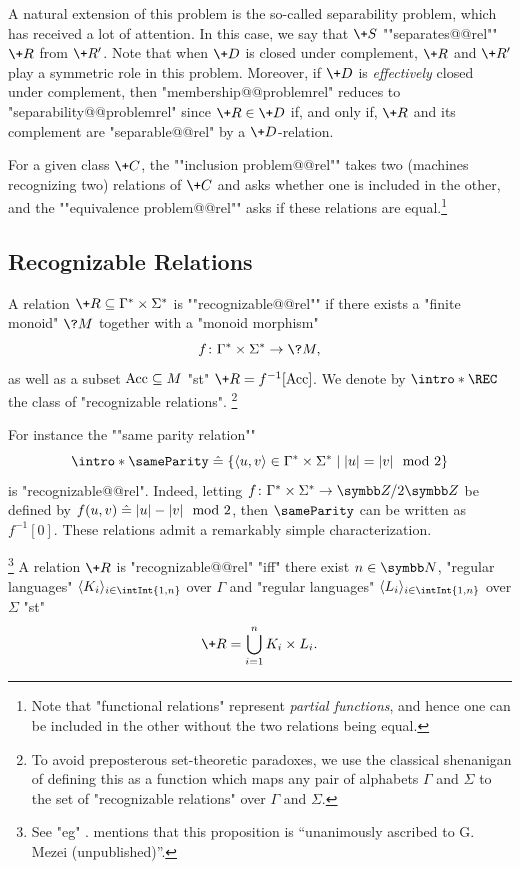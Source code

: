 A natural extension of this problem is the so-called separability problem,
which has received a lot of attention.
In this case, we say that $\+S$ ""separates@@rel"" $\+R$ from $\+R'$.
Note that when $\+D$ is closed under complement, $\+R$ and $\+R'$ play a symmetric role in this problem. Moreover, if $\+D$ is \emph{effectively} closed under complement,
then "membership@@problemrel" reduces to "separability@@problemrel" 
since $\+R \in \+D$ if, and only if, $\+R$ and its complement are "separable@@rel" by
a $\+D$-relation.

For a given class $\+C$, the \AP""inclusion problem@@rel"" takes two (machines recognizing two) 
relations of $\+C$ and asks whether one is included in the other, and the \AP""equivalence 
problem@@rel"" asks if these relations are equal.\footnote{Note that "functional relations"
represent \emph{partial functions}, and hence one can be included in the other without the
two relations being equal.}



\subsection{Recognizable Relations}

A relation $\+R \subseteq \Gamma^* \times \Sigma^*$ is \AP""recognizable@@rel""
if there exists a "finite monoid" $\?M$ together with a "monoid morphism"
\[
	f\colon \Gamma^* \times \Sigma^* \to \?M,
\]
as well as a subset $\textrm{Acc} \subseteq M$ "st"
$\+R = f^{-1}[\Acc]$. We denote by \AP$\intro*\REC$ the class of "recognizable relations".%
\footnote{To avoid preposterous set-theoretic paradoxes, 
we use the classical shenanigan of defining this as a function which maps
any pair of alphabets $\Gamma$ and $\Sigma$ to the set of "recognizable relations" over $\Gamma$ and $\Sigma$.}

For instance the \AP""same parity relation""
\[
	{\intro*\sameParity} \defeq 
	\{
		\tup{u,v} \in \Gamma^* \times \Sigma^* \mid
		|u| = |v| \mod{2}
	\}
\]
is "recognizable@@rel". Indeed, letting $f\colon  \Gamma^* \times \Sigma^* \to \ZnZ{2}$
be defined by $f(u,v) \mathrel{\hat{=}} |u| - |v| \mod{2}$,
then $\sameParity$ can be written as $f^{-1}[0]$.
These relations admit a remarkably simple characterization.\AP
\begin{proposition}
	\!\footnote{See "eg" \cite[Corollary~II.2.20, p.~254]{Sakarovitch2009Elements}.
	\cite[\S~2, ``Notes \& references'']{Sakarovitch2009Elements} mentions
	that this proposition is ``unanimously ascribed to G. Mezei (unpublished)''.}
	\label{prop:Mezei-theorem}
	A relation $\+R$ is "recognizable@@rel" "iff" there exist $n\in\N$,
	"regular languages" $\tup{K_i}_{i\in \intInt{1,n}}$ over $\Gamma$
	and "regular languages" $\tup{L_i}_{i\in \intInt{1,n}}$ over $\Sigma$
	"st"
	\[
		\+R = \bigcup_{i=1}^n K_i \times L_i.
	\]
\end{proposition}

